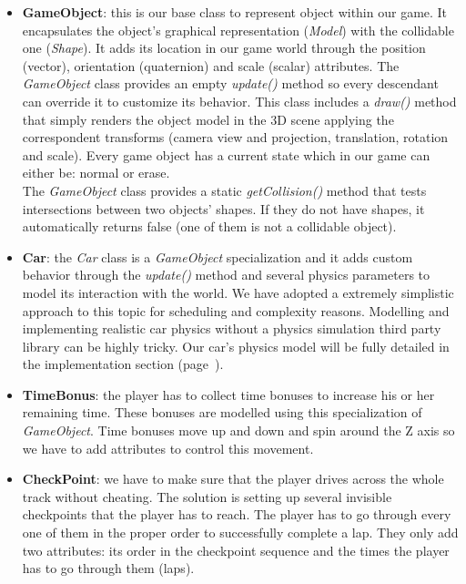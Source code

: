 \begin{itemize}
	\item \textbf{GameObject}: this is our base class to represent object within our game. It encapsulates the
	object's graphical representation (\textit{Model}) with the collidable one (\textit{Shape}). It adds its location
	in our game world through the position (vector), orientation (quaternion) and scale (scalar) attributes.
	The \textit{GameObject} class provides an empty \textit{update()} method so every descendant can override it
	to customize its behavior. This class includes a \textit{draw()} method that simply renders the object model
	in the 3D scene applying the correspondent transforms (camera view and projection, translation, rotation and scale).
	Every game object has a current state which in our game can either be: normal or erase.\\
	
	The \textit{GameObject} class provides a static \textit{getCollision()} method that tests intersections
	between two objects' shapes. If they do not have shapes, it automatically returns false (one of them is 
	not a collidable object).
	
	\item \textbf{Car}: the \textit{Car} class is a \textit{GameObject} specialization and it adds custom behavior
	through the \textit{update()} method and several physics parameters to model its interaction with the world. We have
	adopted a extremely simplistic approach to this topic for scheduling and complexity reasons. Modelling and
	implementing realistic car physics without a physics simulation third party library can be highly tricky.
	Our car's physics model will be fully detailed in the implementation section (page~\pageref{sec:imp-car}).
	\item \textbf{TimeBonus}: the player has to collect time bonuses to increase his or her remaining time. These
	bonuses are modelled using this specialization of \textit{GameObject}. Time bonuses move up and down and spin
	around the Z axis so we have to add attributes to control this movement.
	\item \textbf{CheckPoint}: we have to make sure that the player drives across the whole track without cheating.
	The solution is setting up several invisible checkpoints that the player has to reach. The player has to go through
	every one of them in the proper order to successfully complete a lap. They only add two attributes: its order
	in the checkpoint sequence and the times the player has to go through them (laps).
\end{itemize}

